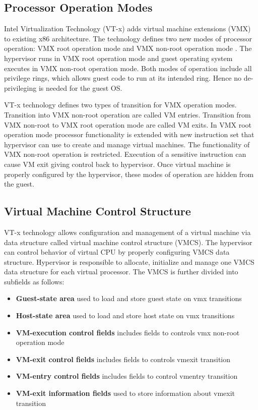 \subsection{Processor Operation Modes}
Intel Virtualization Technology (VT-x) adds virtual machine extensions (VMX) to existing x86 architecture.
The technology defines two new modes of processor operation: VMX root operation mode and VMX non-root operation mode \cite{intel-sdm-vol3}.
The hypervisor runs in VMX root operation mode and guest operating system executes in VMX non-root operation mode.
Both modes of operation include all privilege rings, which allows guest code to run at its intended ring. 
Hence no de-privileging is needed for the guest OS.

VT-x technology defines two types of transition for VMX operation modes. 
Transition into VMX non-root operation are called VM entries. 
Transition from VMX non-root to VMX root operation mode are called VM exits.
In VMX root operation mode processor functionality is extended with new instruction set that
hypervisor can use to create and manage virtual machines.
The functionality of VMX non-root operation is restricted. 
Execution of a sensitive instruction can cause VM exit giving control back to hypervisor.
Once virtual machine is properly configured by the hypervisor, these modes of operation are hidden from the guest. 

\subsection{Virtual Machine Control Structure}
VT-x technology allows configuration and management of a virtual machine via data structure called virtual machine control structure (VMCS).
The hypervisor can control behavior of virtual CPU by properly configuring VMCS data structure.
Hypervisor is responsible to allocate, initialize and manage one VMCS data structure for each virtual processor.
The VMCS is further divided into subfields as follows:
\begin{itemize}
	\item \textbf{Guest-state area} used to load and store guest state on vmx transitions
	\item \textbf{Host-state area} used to load and store host state on vmx transitions
	\item \textbf{VM-execution control fields} includes fields to controls vmx non-root operation mode
	\item \textbf{VM-exit control fields} includes fields to controls vmexit transition
	\item \textbf{VM-entry control fields} includes fields to control vmentry transition
	\item \textbf{VM-exit information fields} used to store information about vmexit transition
\end{itemize}

